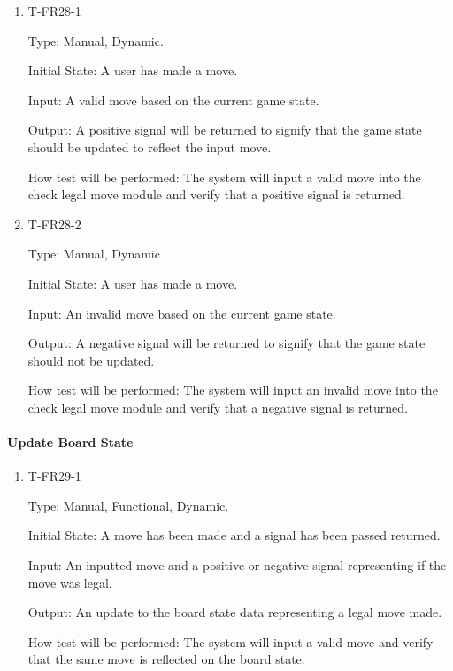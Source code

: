 \documentclass[12pt, titlepage]{article}
\begin{document}
        \begin{enumerate}
        
            \item{T-FR28-1\\}
            
                Type: Manual, Dynamic.
                					
                Initial State: A user has made a move.
                					
                Input: A valid move based on the current game state.
                					
                Output: A positive signal will be returned to signify that the game state should be updated to reflect the input move.
                					
                How test will be performed: The system will input a valid move into the check legal move module and verify that a positive signal is returned.
            
            \item{T-FR28-2\\}
            
                Type: Manual, Dynamic
                					
                Initial State: A user has made a move.
                					
                Input: An invalid move based on the current game state.
                					
                Output: A negative signal will be returned to signify that the game state should not be updated.
                					
                How test will be performed: The system will input an invalid move into the check legal move module and verify that a negative signal is returned.
        
        \end{enumerate}
    
    \paragraph{Update Board State}

        \begin{enumerate}

        \item{T-FR29-1\\}

            Type: Manual, Functional, Dynamic.
            					
            Initial State: A move has been made and a signal has been passed returned.
            					
            Input: An inputted move and a positive or negative signal representing if the move was legal.
            					
            Output: An update to the board state data representing a legal move made.

            How test will be performed: The system will input a valid move and verify that the same move is reflected on the board state.

        \end{enumerate}
        
\end{document}
